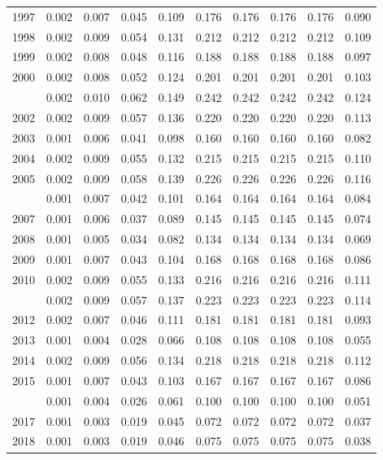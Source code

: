 \documentclass[
]{article}
\begin{document}
\begin{longtable}[t]{lrrrrrrrrr}
1997 & 0.002 & 0.007 & 0.045 & 0.109 & 0.176 & 0.176 & 0.176 & 0.176 & 0.090\\
1998 & 0.002 & 0.009 & 0.054 & 0.131 & 0.212 & 0.212 & 0.212 & 0.212 & 0.109\\
1999 & 0.002 & 0.008 & 0.048 & 0.116 & 0.188 & 0.188 & 0.188 & 0.188 & 0.097\\
2000 & 0.002 & 0.008 & 0.052 & 0.124 & 0.201 & 0.201 & 0.201 & 0.201 & 0.103\\
\addlinespace
2001 & 0.002 & 0.010 & 0.062 & 0.149 & 0.242 & 0.242 & 0.242 & 0.242 & 0.124\\
2002 & 0.002 & 0.009 & 0.057 & 0.136 & 0.220 & 0.220 & 0.220 & 0.220 & 0.113\\
2003 & 0.001 & 0.006 & 0.041 & 0.098 & 0.160 & 0.160 & 0.160 & 0.160 & 0.082\\
2004 & 0.002 & 0.009 & 0.055 & 0.132 & 0.215 & 0.215 & 0.215 & 0.215 & 0.110\\
2005 & 0.002 & 0.009 & 0.058 & 0.139 & 0.226 & 0.226 & 0.226 & 0.226 & 0.116\\
\addlinespace
2006 & 0.001 & 0.007 & 0.042 & 0.101 & 0.164 & 0.164 & 0.164 & 0.164 & 0.084\\
2007 & 0.001 & 0.006 & 0.037 & 0.089 & 0.145 & 0.145 & 0.145 & 0.145 & 0.074\\
2008 & 0.001 & 0.005 & 0.034 & 0.082 & 0.134 & 0.134 & 0.134 & 0.134 & 0.069\\
2009 & 0.001 & 0.007 & 0.043 & 0.104 & 0.168 & 0.168 & 0.168 & 0.168 & 0.086\\
2010 & 0.002 & 0.009 & 0.055 & 0.133 & 0.216 & 0.216 & 0.216 & 0.216 & 0.111\\
\addlinespace
2011 & 0.002 & 0.009 & 0.057 & 0.137 & 0.223 & 0.223 & 0.223 & 0.223 & 0.114\\
2012 & 0.002 & 0.007 & 0.046 & 0.111 & 0.181 & 0.181 & 0.181 & 0.181 & 0.093\\
2013 & 0.001 & 0.004 & 0.028 & 0.066 & 0.108 & 0.108 & 0.108 & 0.108 & 0.055\\
2014 & 0.002 & 0.009 & 0.056 & 0.134 & 0.218 & 0.218 & 0.218 & 0.218 & 0.112\\
2015 & 0.001 & 0.007 & 0.043 & 0.103 & 0.167 & 0.167 & 0.167 & 0.167 & 0.086\\
\addlinespace
2016 & 0.001 & 0.004 & 0.026 & 0.061 & 0.100 & 0.100 & 0.100 & 0.100 & 0.051\\
2017 & 0.001 & 0.003 & 0.019 & 0.045 & 0.072 & 0.072 & 0.072 & 0.072 & 0.037\\
2018 & 0.001 & 0.003 & 0.019 & 0.046 & 0.075 & 0.075 & 0.075 & 0.075 & 0.038\\*
\end{longtable}
\end{document}
